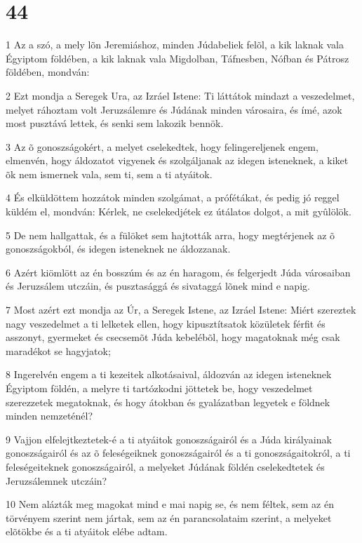 \chapter{44}

\par 1 Az a szó, a mely lõn Jeremiáshoz, minden Júdabeliek felõl, a kik laknak vala Égyiptom földében, a kik laknak vala Migdolban, Táfnesben, Nófban és Pátrosz földében, mondván:
\par 2 Ezt mondja a Seregek Ura, az Izráel Istene: Ti láttátok mindazt a veszedelmet, melyet ráhoztam volt Jeruzsálemre és Júdának minden városaira, és ímé, azok most pusztává lettek, és senki sem lakozik bennök.
\par 3 Az õ gonoszságokért, a melyet cselekedtek, hogy felingereljenek engem, elmenvén, hogy áldozatot vigyenek és szolgáljanak az idegen isteneknek, a kiket õk nem ismernek vala, sem ti, sem a ti atyáitok.
\par 4 És elküldöttem hozzátok minden szolgámat, a prófétákat, és pedig jó reggel küldém el, mondván: Kérlek, ne cselekedjétek ez útálatos dolgot, a mit gyûlölök.
\par 5 De nem hallgattak, és a fülöket sem hajtották arra, hogy megtérjenek az õ gonoszságokból, és idegen isteneknek ne áldozzanak.
\par 6 Azért kiömlött az én bosszúm és az én haragom, és felgerjedt Júda városaiban és Jeruzsálem utczáin, és pusztasággá és sivataggá lõnek mind e napig.
\par 7 Most azért ezt mondja az Úr, a Seregek Istene, az Izráel Istene: Miért szereztek nagy veszedelmet a ti lelketek ellen, hogy kipusztítsatok közületek férfit és asszonyt, gyermeket és csecsemõt Júda kebelébõl, hogy magatoknak még csak maradékot se hagyjatok;
\par 8 Ingerelvén engem a ti kezeitek alkotásaival, áldozván az idegen isteneknek Égyiptom földén, a melyre ti tartózkodni jöttetek be, hogy veszedelmet szerezzetek megatoknak, és hogy átokban és gyalázatban legyetek e földnek minden nemzeténél?
\par 9 Vajjon elfelejtkeztetek-é a ti atyáitok gonoszságairól és a Júda királyainak gonoszságairól és az õ feleségeiknek gonoszságairól és a ti gonoszságaitokról, a ti feleségeiteknek gonoszságairól, a melyeket Júdának földén cselekedtetek és Jeruzsálemnek utczáin?
\par 10 Nem alázták meg magokat mind e mai napig se, és nem féltek, sem az én törvényem szerint nem jártak, sem az én parancsolataim szerint, a melyeket elõtökbe és a ti atyáitok elébe adtam.
